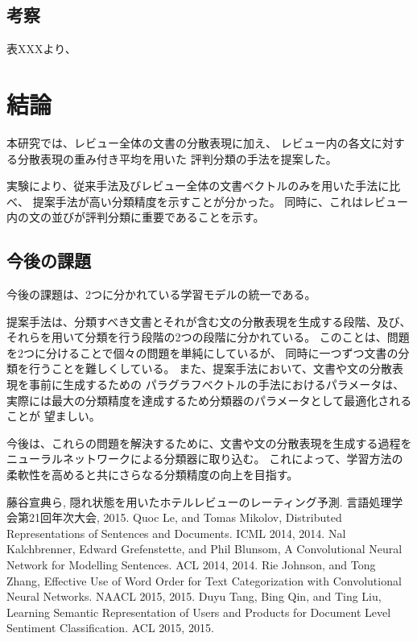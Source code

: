 \documentclass{ttithesis}
\begin{document}
\subsection{考察}

表XXXより、



\section{結論}

本研究では、レビュー全体の文書の分散表現に加え、
レビュー内の各文に対する分散表現の重み付き平均を用いた
評判分類の手法を提案した。

実験により、従来手法\cite{fujitani15}及びレビュー全体の文書ベクトルのみを用いた手法に比べ、
提案手法が高い分類精度を示すことが分かった。
同時に、これはレビュー内の文の並びが評判分類に重要であることを示す。



\subsection{今後の課題}

今後の課題は、2つに分かれている学習モデルの統一である。

提案手法は、分類すべき文書とそれが含む文の分散表現を生成する段階、及び、
それらを用いて分類を行う段階の2つの段階に分かれている。
このことは、問題を2つに分けることで個々の問題を単純にしているが、
同時に一つずつ文書の分類を行うことを難しくしている。
また、提案手法において、文書や文の分散表現を事前に生成するための
パラグラフベクトルの手法におけるパラメータは、
実際には最大の分類精度を達成するため分類器のパラメータとして最適化されることが
望ましい。

今後は、これらの問題を解決するために、文書や文の分散表現を生成する過程を
ニューラルネットワークによる分類器に取り込む。
これによって、学習方法の柔軟性を高めると共にさらなる分類精度の向上を目指す。




\begin{thebibliography}{9}
  藤谷宣典ら,
  隠れ状態を用いたホテルレビューのレーティング予測.
  言語処理学会第21回年次大会, 2015.
  Quoc Le, and Tomas Mikolov,
  Distributed Representations of Sentences and Documents.
  ICML 2014, 2014.
  Nal Kalchbrenner, Edward Grefenstette, and Phil Blunsom,
  A Convolutional Neural Network for Modelling Sentences.
  ACL 2014, 2014.
  Rie Johnson, and Tong Zhang,
  Effective Use of Word Order for Text Categorization
  with Convolutional Neural Networks.
  NAACL 2015, 2015.
  Duyu Tang, Bing Qin, and Ting Liu,
  Learning Semantic Representation of Users and Products
  for Document Level Sentiment Classification.
  ACL 2015, 2015.
\end{thebibliography}
\end{document}
